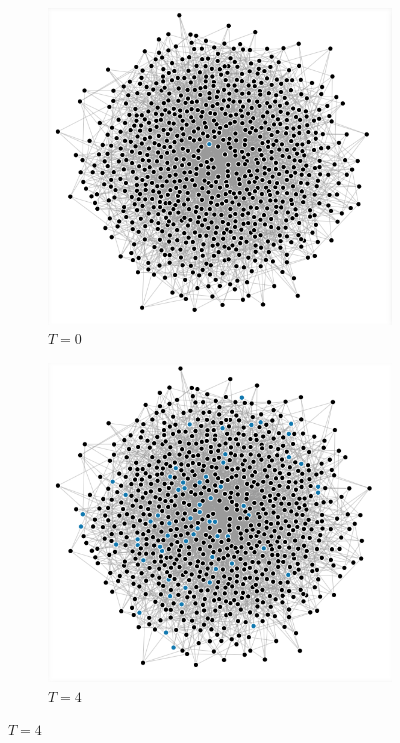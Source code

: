 \documentclass[10pt,journal,a4paper]{IEEEtran}
\begin{document}
\begin{figure}[h]
\centering

\begin{subfigure}[b]{.5\linewidth}
\includegraphics[width=1\linewidth]{figs/barabasi-albert-0}
\caption{$T=0$}
\end{subfigure}%
\begin{subfigure}[b]{.5\linewidth}
\includegraphics[width=1\linewidth]{figs/barabasi-albert-4}
\caption{$T=4$}
\end{subfigure}


\end{figure}
\end{document}

